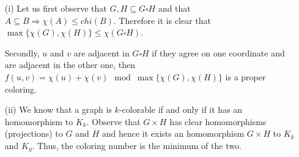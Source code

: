 \begin{itemize}
    \item[(i)] Let us first observe that $G, H \subseteq G \square H$ and that $A \subseteq B \Rightarrow \chi(A) \leq chi(B)$.
        Therefore it is clear that $\max\{\chi(G), \chi(H)\} \leq \chi(G \square H)$.

        Secondly, $u$ and $v$ are adjacent in $G \square H$ if they agree on one coordinate and are adjacent in the other one, then $f(u,v) = \chi(u) + \chi(v) \mod \max\{\chi(G), \chi(H)\}$ is a proper coloring.
    \item[(ii)] We know that a graph is $k$-colorable if and only if it has an homomorphism to $K_k$. 
        Observe that $G \times H$ has clear homomorphisms (projections) to $G$ and $H$ and hence it exists an homomorphism $G \times H$ to $K_k$ and $K_g$.
        Thus, the coloring number is the minimum of the two.
\end{itemize}
